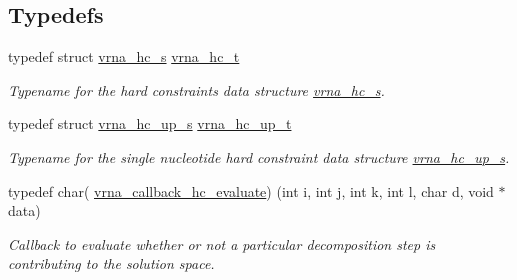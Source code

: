 \subsection*{Typedefs}
\begin{DoxyCompactItemize}
\item 
typedef struct \hyperlink{group__hard__constraints_structvrna__hc__s}{vrna\+\_\+hc\+\_\+s} \hyperlink{group__hard__constraints_gac7e4c4f8abe3163a68110c5bff24e01d}{vrna\+\_\+hc\+\_\+t}\hypertarget{group__hard__constraints_gac7e4c4f8abe3163a68110c5bff24e01d}{}\label{group__hard__constraints_gac7e4c4f8abe3163a68110c5bff24e01d}

\begin{DoxyCompactList}\small\item\em Typename for the hard constraints data structure \hyperlink{group__hard__constraints_structvrna__hc__s}{vrna\+\_\+hc\+\_\+s}. \end{DoxyCompactList}\item 
typedef struct \hyperlink{group__hard__constraints_structvrna__hc__up__s}{vrna\+\_\+hc\+\_\+up\+\_\+s} \hyperlink{group__hard__constraints_ga8cd53427a942a81c87ec526bbff32ef9}{vrna\+\_\+hc\+\_\+up\+\_\+t}\hypertarget{group__hard__constraints_ga8cd53427a942a81c87ec526bbff32ef9}{}\label{group__hard__constraints_ga8cd53427a942a81c87ec526bbff32ef9}

\begin{DoxyCompactList}\small\item\em Typename for the single nucleotide hard constraint data structure \hyperlink{group__hard__constraints_structvrna__hc__up__s}{vrna\+\_\+hc\+\_\+up\+\_\+s}. \end{DoxyCompactList}\item 
typedef char( \hyperlink{group__hard__constraints_ga16eb71ac9a7a35369be2eaa9d8f8dfa0}{vrna\+\_\+callback\+\_\+hc\+\_\+evaluate}) (int i, int j, int k, int l, char d, void $\ast$data)
\begin{DoxyCompactList}\small\item\em Callback to evaluate whether or not a particular decomposition step is contributing to the solution space. \end{DoxyCompactList}\end{DoxyCompactItemize}
